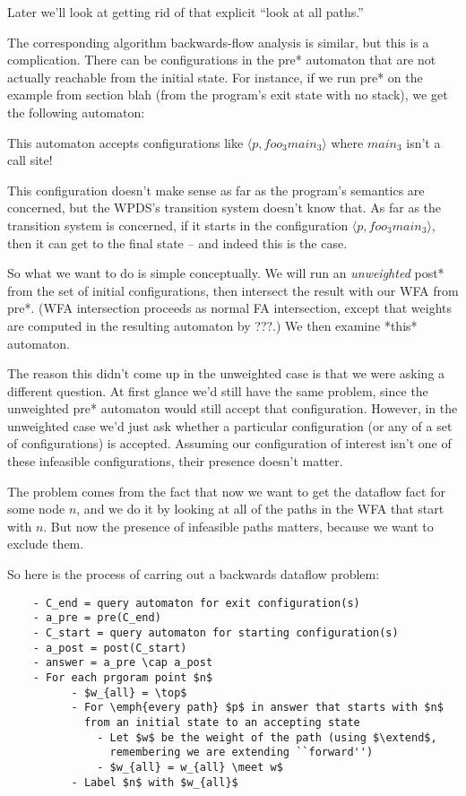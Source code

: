 \documentclass{article}
\newcommand{\Config}[2]{\ensuremath{\langle #1, #2 \rangle}}
\newcommand{\meet}{\sqcap}
\newcommand{\extend}{\otimes}
\begin{document}
Later we'll look at getting rid of that explicit ``look at all
paths.''

The corresponding algorithm backwards-flow analysis is similar, but
this is a complication. There can be configurations in the pre*
automaton that are not actually reachable from the initial state. For
instance, if we run pre* on the example from section blah (from the
program's exit state with no stack), we get the following automaton:

This automaton accepts configurations like \Config{p}{foo_3 main_3}
where $main_3$ isn't a call site!

This configuration doesn't make sense as far as the program's
semantics are concerned, but the WPDS's transition system doesn't know
that. As far as the transition system is concerned, if it starts in
the configuration \Config{p}{foo_3 main_3}, then it can get to the
final state -- and indeed this is the case. 

So what we want to do is simple conceptually. We will run an
\emph{unweighted} post* from the set of initial configurations, then
intersect the result with our WFA from pre*. (WFA intersection
proceeds as normal FA intersection, except that weights are computed
in the resulting automaton by ???.) We then examine *this* automaton.

  The reason this didn't come up in the unweighted case is that we
  were asking a different question. At first glance we'd still have
  the same problem, since the unweighted pre* automaton would still
  accept that configuration. However, in the unweighted case we'd just
  ask whether a particular configuration (or any of a set of
  configurations) is accepted. Assuming our configuration of interest
  isn't one of these infeasible configurations, their presence doesn't
  matter.
  
  The problem comes from the fact that now we want to get the dataflow
  fact for some node $n$, and we do it by looking at all of the paths
  in the WFA that start with $n$. But now the presence of infeasible
  paths matters, because we want to exclude them.

So here is the process of carring out a backwards dataflow problem:
\begin{verbatim}
    - C_end = query automaton for exit configuration(s)
    - a_pre = pre(C_end)
    - C_start = query automaton for starting configuration(s)
    - a_post = post(C_start)
    - answer = a_pre \cap a_post
    - For each prgoram point $n$
          - $w_{all} = \top$
          - For \emph{every path} $p$ in answer that starts with $n$
            from an initial state to an accepting state
              - Let $w$ be the weight of the path (using $\extend$,
                remembering we are extending ``forward'')
              - $w_{all} = w_{all} \meet w$
          - Label $n$ with $w_{all}$
\end{verbatim}
\end{document}
